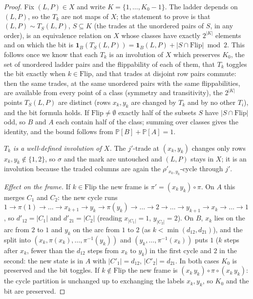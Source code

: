 \documentclass[11pt]{article}
\theoremstyle{definition}
\renewcommand{\Pr}{\mathbb{P}}
\begin{document}
\begin{proof}
Fix $(L,P)\in X$ and write $K=\{1,\dots,K_0-1\}$.  The ladder depends
on $(L,P)$, so the $T_k$ are not maps of $X$; the statement to prove is
that $(L,P)\sim T_S(L,P)$, $S\subseteq K$ (the trades at the
unordered pairs of $S$, in any order), is an equivalence relation on
$X$ whose classes have exactly $2^{|K|}$ elements and on which the bit
is $\mathbf 1_B(T_S(L,P))=\mathbf 1_B(L,P)+|S\cap\mathrm{Flip}|\bmod2$.
This follows once we know that each $T_k$ is an involution of $X$
which preserves $K_0$, the set of unordered ladder pairs and the
flippability of each of them, that $T_k$ toggles the bit exactly when
$k\in\mathrm{Flip}$, and that trades at disjoint row pairs commute:
then the same trades, at the same unordered pairs with the same
flippabilities, are available from every point of a class (symmetry
and transitivity), the $2^{|K|}$ points $T_S(L,P)$ are distinct
(rows $x_k,y_k$ are changed by $T_k$ and by no other $T_i$), and the
bit formula holds.  If $\mathrm{Flip}\ne\emptyset$ exactly half of the
subsets $S$ have $|S\cap\mathrm{Flip}|$ odd, so $B$ and $A$ each
contain half of the class; summing over classes gives the identity,
and the bound follows from $\Pr[B]+\Pr[A]=1$.

\emph{$T_k$ is a well-defined involution of $X$.}  The $j'$-trade at
$(x_k,y_k)$ changes only rows $x_k,y_k\notin\{1,2\}$, so $\sigma$ and
the mark are untouched and $(L,P)$ stays in $X$; it is an involution
because the traded columns are again the $\rho'_{x_k,y_k}$-cycle
through $j'$.

\emph{Effect on the frame.}  If $k\in\mathrm{Flip}$ the new frame is
$\pi'=(x_k\,y_k)\circ\pi$.  On $A$ this merges $C_1$ and $C_2$: the
new cycle runs $1\to\pi(1)\to\dots\to x_{k+1}\to y_k\to\pi(y_k)\to\dots
\to2\to\dots\to y_{k+1}\to x_k\to\dots\to1$, so $d'_{12}=|C_1|$ and
$d'_{21}=|C_2|$ (reading $x_{|C_1|}=1$, $y_{|C_2|}=2$).  On $B$,
$x_k$ lies on the arc from $2$ to $1$ and $y_k$ on the arc from $1$ to
$2$ (as $k<\min(d_{12},d_{21})$), and the split into
$(x_k,\pi(x_k),\dots,\pi^{-1}(y_k))$ and $(y_k,\dots,\pi^{-1}(x_k))$
puts $1$ ($k$ steps after $x_k$, fewer than the $d_{12}$ steps from
$x_k$ to $y_k$) in the first cycle and $2$ in the second: the new
state is in $A$ with $|C'_1|=d_{12}$, $|C'_2|=d_{21}$.  In both cases
$K_0$ is preserved and the bit toggles.  If $k\notin\mathrm{Flip}$ the
new frame is $(x_k\,y_k)\circ\pi\circ(x_k\,y_k)$: the cycle partition
is unchanged up to exchanging the labels $x_k,y_k$, so $K_0$ and the
bit are preserved.


\end{proof}
\end{document}
